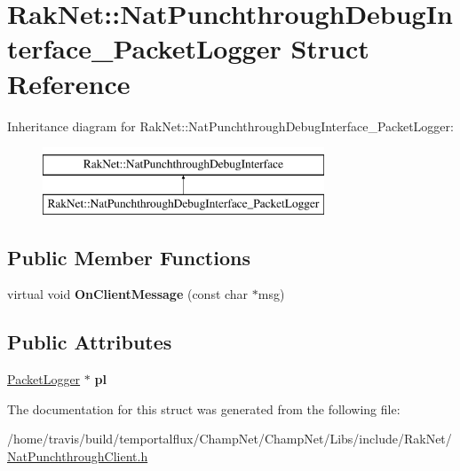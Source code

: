 \hypertarget{struct_rak_net_1_1_nat_punchthrough_debug_interface___packet_logger}{\section{Rak\-Net\-:\-:Nat\-Punchthrough\-Debug\-Interface\-\_\-\-Packet\-Logger Struct Reference}
\label{struct_rak_net_1_1_nat_punchthrough_debug_interface___packet_logger}
}
Inheritance diagram for Rak\-Net\-:\-:Nat\-Punchthrough\-Debug\-Interface\-\_\-\-Packet\-Logger\-:\begin{figure}[H]
\begin{center}
\leavevmode
\includegraphics[height=2.000000cm]{struct_rak_net_1_1_nat_punchthrough_debug_interface___packet_logger}
\end{center}
\end{figure}
\subsection*{Public Member Functions}
\begin{DoxyCompactItemize}
\item 
\hypertarget{struct_rak_net_1_1_nat_punchthrough_debug_interface___packet_logger_a979044569d394ab52e10869865b859b3}{virtual void {\bfseries On\-Client\-Message} (const char $\ast$msg)}\label{struct_rak_net_1_1_nat_punchthrough_debug_interface___packet_logger_a979044569d394ab52e10869865b859b3}

\end{DoxyCompactItemize}
\subsection*{Public Attributes}
\begin{DoxyCompactItemize}
\item 
\hypertarget{struct_rak_net_1_1_nat_punchthrough_debug_interface___packet_logger_acabeb0761a1d609ba99e4ed23bd85632}{\hyperlink{class_rak_net_1_1_packet_logger}{Packet\-Logger} $\ast$ {\bfseries pl}}\label{struct_rak_net_1_1_nat_punchthrough_debug_interface___packet_logger_acabeb0761a1d609ba99e4ed23bd85632}

\end{DoxyCompactItemize}


The documentation for this struct was generated from the following file\-:\begin{DoxyCompactItemize}
\item 
/home/travis/build/temportalflux/\-Champ\-Net/\-Champ\-Net/\-Libs/include/\-Rak\-Net/\hyperlink{_nat_punchthrough_client_8h}{Nat\-Punchthrough\-Client.\-h}\end{DoxyCompactItemize}
